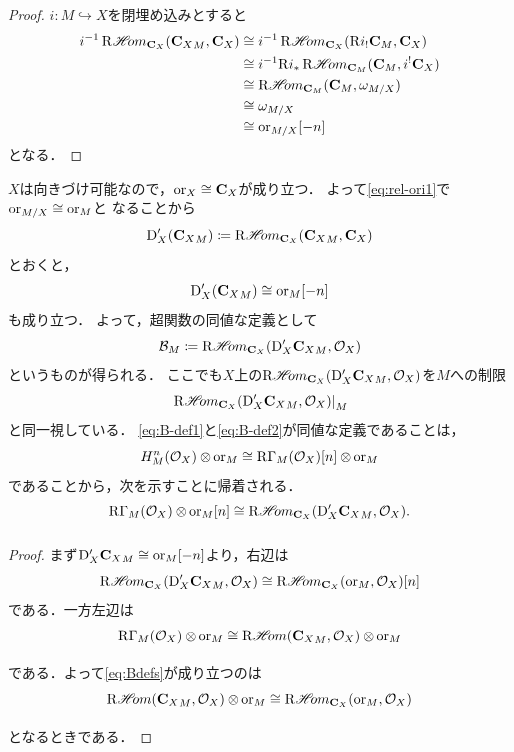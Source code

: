 \begin{proof}
    \(i\colon M\hookrightarrow X\)を閉埋め込みとすると
    \begin{align*}
        i^{-1}\RHOM_{\cc_X}({\cc_{X}}_{M},\cc_{X})
        &\cong i^{-1}\RHOM_{\cc_X}(\Rder{i}_{!}\cc_{M},\cc_{X})\\
        &\cong i^{-1}\Rder{i}_{\ast}\RHOM_{\cc_M}(\cc_{M},i^{!}\cc_{X})\\    
        &\cong \RHOM_{\cc_M}(\cc_{M},\omega_{M/X})\\
        &\cong\omega_{M/X}\\
        &\cong\ori_{M/X}[-n]
    \end{align*}
    となる．
\end{proof}
\(X\)は向きづけ可能なので，\(\ori_X\cong\cc_X\)が成り立つ．
よって\eqref{eq:rel-ori1}で\(\ori_{M/X}\cong\ori_{M}\)と
なることから
\[    
    \rmD'_{X}({\cc_{X}}_{M})
    \coloneqq
    \RHOM_{\cc_X}({\cc_{X}}_{M},\cc_{X})
\]とおくと，
\[
    \rmD'_{X}({\cc_{X}}_{M})
    \cong\ori_{M}[-n]
\]
も成り立つ．
よって，超関数の同値な定義として
\begin{equation}\label{eq:B-def2}
    \cB_{M}\coloneqq
    \RHOM_{\cc_X}(\rmD_{X}'{\cc_X}_{M},\cO_X)
\end{equation}
というものが得られる．
ここでも\(X\)上の\(
    \RHOM_{\cc_X}(\rmD_{X}'{\cc_X}_{M},\cO_X)
\)を\(M\)への制限\[
    \mres[\RHOM_{\cc_X}(\rmD_{X}'{\cc_X}_{M},\cO_X)]{M}
\]と同一視している．
\eqref{eq:B-def1}と\eqref{eq:B-def2}が同値な定義であることは，
\[
    H^{n}_{M}(\cO_X)\tens[]\ori_{M}
    \cong
    \RG_{M}(\cO_{X})[n]\tens[]\ori_{M}
\]
であることから，次を示すことに帰着される．
\begin{equation}\label{eq:Bdefs}
    \RG_{M}(\cO_X)\ttens[]\ori_{M}[n]
    \cong 
    \RHOM_{\cc_X}(\rmD'_{X}{\cc_X}_M,\cO_X).
\end{equation}
\begin{proof}
    まず\(\rmD_{X}'{\cc_X}_{M}\cong\ori_{M}[-n]\)より，右辺は\[
        \RHOM_{\cc_X}(\rmD'_{X}{\cc_X}_M,\cO_X)
        \cong
        \RHOM_{\cc_X}(\ori_{M},\cO_X)[n]
    \]
    である．一方左辺は
    \[
        \RG_{M}(\cO_X)\ttens[]\ori_{M}
        \cong
        \RHOM({\cc_{X}}_{M},\cO_X)\ttens[]\ori_{M}
    \]である．よって\eqref{eq:Bdefs}が成り立つのは\[
        \RHOM({\cc_{X}}_{M},\cO_X)\ttens[]\ori_{M}
        \cong 
        \RHOM_{\cc_X}(\ori_{M},\cO_X)
    \]となるときである．
\end{proof}

